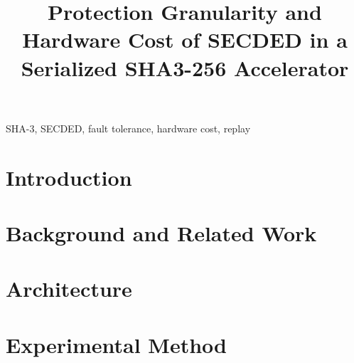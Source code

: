 \documentclass[conference]{IEEEtran}
\begin{document}
\title{Protection Granularity and Hardware Cost of SECDED in a Serialized SHA3-256 Accelerator}

\author{
}

\maketitle

\begin{abstract}
\end{abstract}

\begin{IEEEkeywords}
SHA-3, SECDED, fault tolerance, hardware cost, replay
\end{IEEEkeywords}

\section{Introduction}




\section{Background and Related Work}




\section{Architecture}





\section{Experimental Method}





\end{document}
